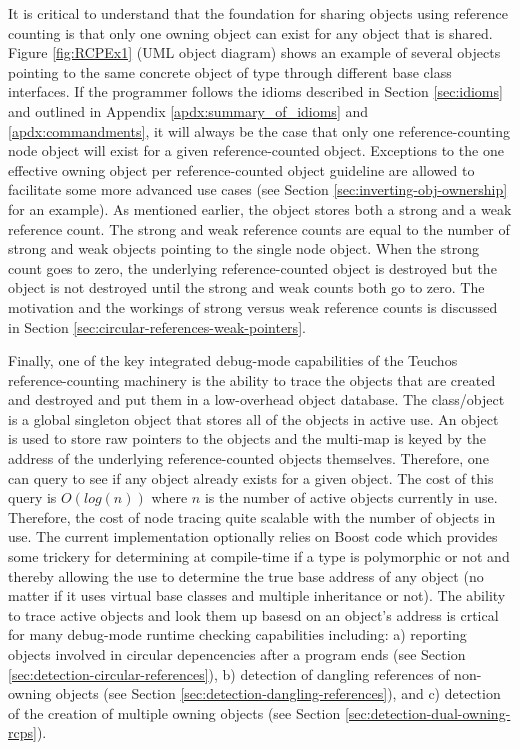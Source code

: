 \documentclass[pdf,ps2pdf,11pt]{SANDreport}
\begin{document}
It is critical to understand that the foundation for sharing objects
using reference counting is that only one owning {}
object can exist for any object that is shared.  Figure
{}\ref{fig:RCPEx1} (UML object diagram) shows an example of several
{} objects pointing to the same concrete object of type
{} through different base class interfaces.  If the programmer
follows the idioms described in Section {}\ref{sec:idioms} and
outlined in Appendix {}\ref{apdx:summary_of_idioms} and
{}\ref{apdx:commandments}, it will always be the case that only one
reference-counting node object will exist for a given
reference-counted object.  Exceptions to the one effective owning
{} object per reference-counted object guideline are
allowed to facilitate some more advanced use cases (see Section
{}\ref{sec:inverting-obj-ownership} for an example).  As mentioned
earlier, the {} object stores both a strong and a weak
reference count.  The strong and weak reference counts are equal to
the number of strong and weak {} objects pointing to the
single {} node object.  When the strong count goes to zero,
the underlying reference-counted object is destroyed but the
{} object is not destroyed until the strong and weak
counts both go to zero.  The motivation and the workings of strong
versus weak reference counts is discussed in Section
{}\ref{sec:circular-references-weak-pointers}.

Finally, one of the key integrated debug-mode capabilities of the
Teuchos reference-counting machinery is the ability to trace the
{} objects that are created and destroyed and put them in
a low-overhead object database.  The {}
class/object is a global singleton object that stores all of the
{} objects in active use.  An {}
object is used to store raw pointers to the {} objects
and the multi-map is keyed by the {} address of the
underlying reference-counted objects themselves.  Therefore, one can
query to see if any {} object already exists for a given
object.  The cost of this query is $O(log(n))$ where $n$ is the number
of active {} objects currently in use.  Therefore, the
cost of node tracing quite scalable with the number of {}
objects in use.  The current implementation optionally relies on Boost
code which provides some trickery for determining at compile-time if a
type is polymorphic or not and thereby allowing the use
{} to determine the true base
address of any object (no matter if it uses virtual base classes and
multiple inheritance or not).  The ability to trace active
{} objects and look them up basesd on an object's address
is crtical for many debug-mode runtime checking capabilities
including: a) reporting objects involved in circular depencencies
after a program ends (see Section
{}\ref{sec:detection-circular-references}), b) detection of dangling
references of non-owning {} objects (see Section
{}\ref{sec:detection-dangling-references}), and c) detection of the
creation of multiple owning {} objects (see Section
{}\ref{sec:detection-dual-owning-rcps}).
\end{document}
